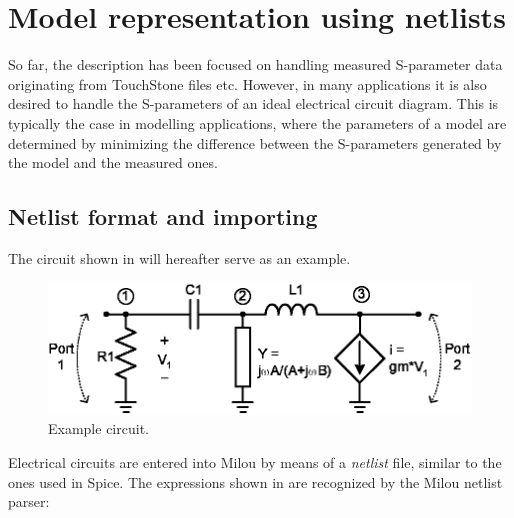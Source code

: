 %
%
\section{Model representation using netlists}\label{sec:mna}
So far, the description has been focused on handling measured
S-parameter data originating from TouchStone files etc. However,
in many applications it is also desired to handle the S-parameters
of an ideal electrical circuit diagram. This is typically the case
in modelling applications, where the parameters of a model are
determined by minimizing the difference between the S-parameters
generated by the model and the measured ones.

\subsection{Netlist format and importing}
The circuit shown in  will hereafter serve as an
example.

\begin{figure}[htbf]
    \centering
  \includegraphics[scale=0.85]{Figures/Circuit.eps}
  \caption{Example circuit.}\label{fig:Circuit}
\end{figure}

Electrical circuits are entered into Milou by means of a
\emph{netlist} file, similar to the ones used in Spice. The
expressions shown in  are recognized by the Milou
netlist parser:

